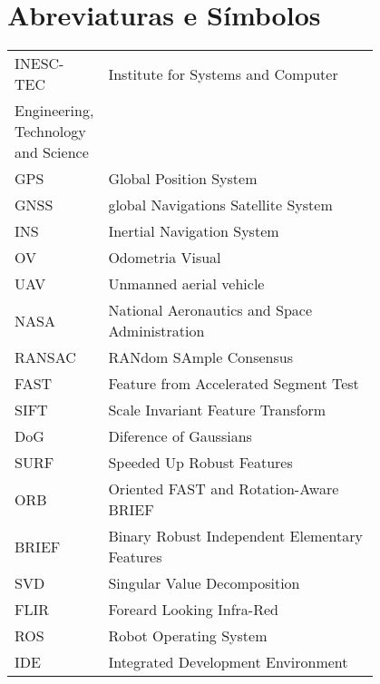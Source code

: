 \chapter*{Abreviaturas e Símbolos}

\begin{flushleft}
\begin{tabular}{l p{0.8\linewidth}}
INESC-TEC & Institute for Systems and Computer\\ Engineering, Technology and Science \\
GPS & Global Position System\\
GNSS & global Navigations Satellite System \\
INS &  Inertial Navigation System\\
OV & Odometria Visual\\
UAV & Unmanned aerial vehicle \\
NASA & National Aeronautics and Space Administration\\
RANSAC & RANdom SAmple Consensus\\
FAST & Feature from Accelerated Segment Test\\
SIFT & Scale Invariant Feature Transform\\
DoG & Diference of Gaussians\\
SURF & Speeded Up Robust Features\\
ORB & Oriented FAST and Rotation-Aware BRIEF\\
BRIEF & Binary Robust Independent Elementary Features\\
SVD & Singular Value Decomposition\\
FLIR & Foreard Looking Infra-Red\\
ROS & Robot Operating System \\
IDE & Integrated Development Environment 
\end{tabular}
\end{flushleft}

